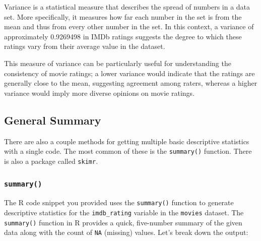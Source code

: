 \documentclass[
]{book}
\newenvironment{Shaded}{\begin{snugshade}}{\end{snugshade}}
\newcommand{\FunctionTok}[1]{\textcolor[rgb]{0.13,0.29,0.53}{\textbf{#1}}}
\newcommand{\NormalTok}[1]{#1}
\newcommand{\SpecialCharTok}[1]{\textcolor[rgb]{0.81,0.36,0.00}{\textbf{#1}}}
\begin{document}
Variance is a statistical measure that describes the spread of numbers in a data set. More specifically, it measures how far each number in the set is from the mean and thus from every other number in the set. In this context, a variance of approximately 0.9269498 in IMDb ratings suggests the degree to which these ratings vary from their average value in the dataset.

This measure of variance can be particularly useful for understanding the consistency of movie ratings; a lower variance would indicate that the ratings are generally close to the mean, suggesting agreement among raters, whereas a higher variance would imply more diverse opinions on movie ratings.

\hypertarget{general-summary}{%
\subsection*{General Summary}\label{general-summary}}

There are also a couple methods for getting multiple basic descriptive statistics with a single code. The most common of these is the \texttt{summary()} function. There is also a package called \texttt{skimr}.

\hypertarget{summary}{%
\subsubsection*{\texorpdfstring{\texttt{summary()}}{summary()}}\label{summary}}

The R code snippet you provided uses the \texttt{summary()} function to generate descriptive statistics for the \texttt{imdb\_rating} variable in the \texttt{movies} dataset. The \texttt{summary()} function in R provides a quick, five-number summary of the given data along with the count of \texttt{NA} (missing) values. Let's break down the output:

\begin{Shaded}
\end{Shaded}
\end{document}
